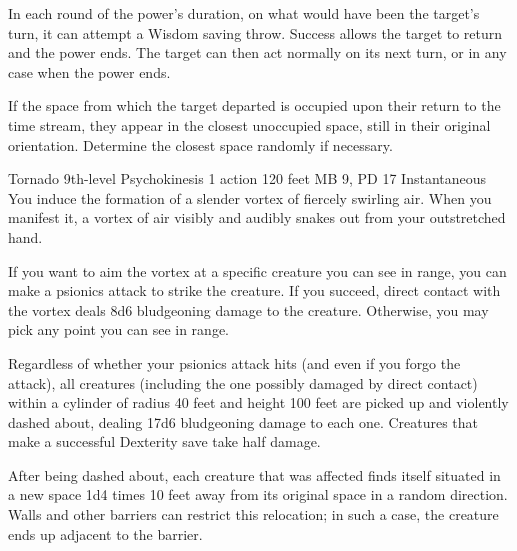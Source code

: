   In each round of the power's duration,
  on what would have been the target's turn,
  it can attempt a Wisdom saving throw.
  Success allows the target to return and the power ends.
  The target can then act normally on its next turn,
  or in any case when the power ends.
  
  If the space from which the target departed is occupied
  upon their return to the time stream,
  they appear in the closest unoccupied space,
  still in their original orientation.
  Determine the closest space randomly if necessary.

\DndPowerHeader%
  {Tornado}
  {9th-level Psychokinesis}
  {1 action}
  {120 feet}
  {MB 9, PD 17}
  {Instantaneous}
  You induce the formation of a slender vortex
  of fiercely swirling air.
  When you manifest it,
  a vortex of air visibly and audibly snakes out from your
  outstretched hand.

  If you want to aim the vortex at a specific creature
  you can see in range,
  you can make a psionics attack to strike the creature.
  If you succeed,
  direct contact with the vortex deals 8d6 bludgeoning damage
  to the creature.
  Otherwise,
  you may pick any point you can see in range.
  
  Regardless of whether your psionics attack hits
  (and even if you forgo the attack),
  all creatures
  (including the one possibly damaged by direct contact)
  within a cylinder of radius 40 feet
  and height 100 feet
  are picked up and violently dashed about,
  dealing 17d6 bludgeoning damage to each one.
  Creatures that make a successful Dexterity save
  take half damage.
  
  After being dashed about,
  each creature that was affected finds itself situated
  in a new space 1d4 times 10 feet
  away from its original space in a random direction.
  Walls and other barriers can restrict this relocation;
  in such a case,
  the creature ends up adjacent to the barrier.

